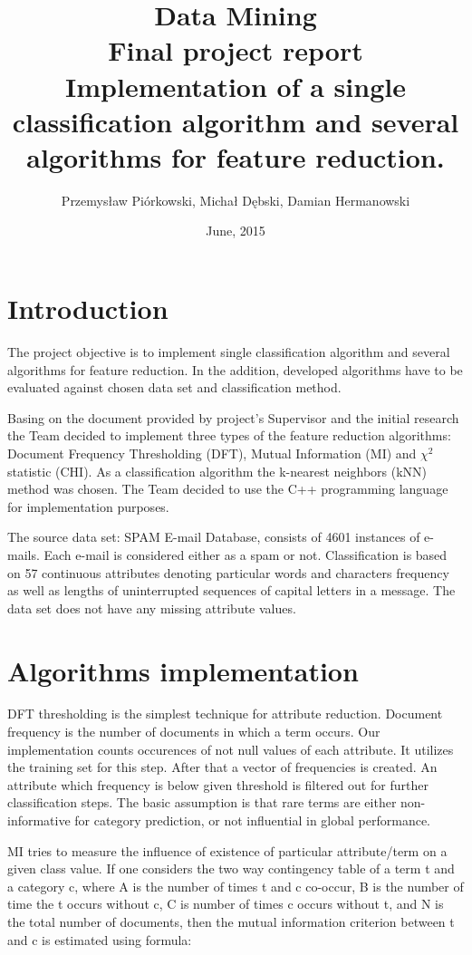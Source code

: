 \documentclass[12pt,a4paper]{report}
\title{Data Mining\\Final project report\\
	\large Implementation of a single classification algorithm and several algorithms for feature reduction.}
\date{June, 2015}
\author{Przemysław Piórkowski, Michał Dębski, Damian Hermanowski}
\begin{document}
\maketitle 
\tableofcontents
\chapter{Introduction}
The project objective is to implement single classification algorithm and several algorithms for feature reduction. In the addition, developed algorithms have to be evaluated against chosen data set and classification method.

Basing on the document provided by project's Supervisor and the initial research the Team decided to implement three types of the feature reduction algorithms: Document Frequency Thresholding (DFT), Mutual Information (MI) and \({\chi}^2\) statistic (CHI). As a classification algorithm the k-nearest neighbors (kNN) method was chosen. The Team decided to use the C++ programming language for implementation purposes.

The source data set: SPAM E-mail Database, consists of 4601 instances of e-mails. Each e-mail is considered either as a spam or not. Classification is based on 57 continuous attributes denoting particular words and characters frequency as well as lengths of uninterrupted sequences of capital letters in a message. The data set does not have any missing attribute values.

\chapter{Algorithms implementation}
DFT thresholding is the simplest technique for attribute
reduction. Document frequency is the number of documents in
which a term occurs. Our implementation counts occurences of not null values of each attribute. It utilizes the training set for this step. After that a vector of frequencies is created. An attribute which frequency is below given threshold is filtered out for further classification steps. The basic assumption is that rare
terms are either non-informative for category prediction,
or not influential in global performance.



MI tries to measure the influence of existence of particular attribute/term on a given class value. If one considers the two way contingency table of a term t and a category c, where A is the number of times t and c co-occur, B is the number of time the t occurs without c, C is number of times c occurs without t, and N is the total number of documents, then the mutual information criterion between t and c is estimated using formula:
\end{document}
